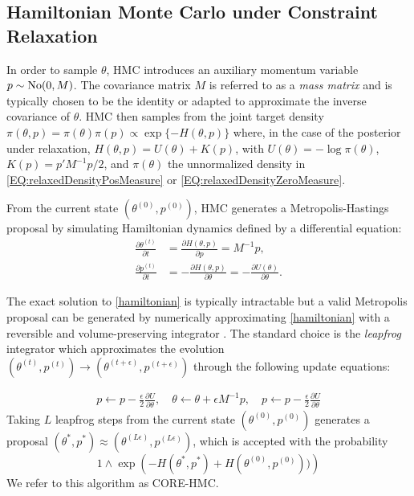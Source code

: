 \documentclass[10pt,fleqn]{article}
\DeclareMathOperator{\1}{\mathbbm{1}} \DeclareMathOperator{\bigO}{\mc O}
\newcommand{\dt}{\epsilon} %
\newcommand{\mass}{M} %
\begin{document}
\subsection{Hamiltonian Monte Carlo under Constraint Relaxation}



In order to sample $\theta$, HMC introduces an auxiliary momentum variable $p
\sim \No(0, \mass)$. The covariance matrix $\mass$ is referred to as a
\textit{mass matrix} and is typically chosen to be the identity or adapted
to approximate the inverse covariance of $\theta$. HMC then samples from the
joint target density $\pi(\theta, p) = \pi(\theta) \pi(p) \propto \exp \{- H(\theta, p)\}$
where, in the case of the posterior under relaxation,
$H(\theta,p) = U(\theta) + K(p)$, with $U(\theta) = -\log\pi(\theta)$, $K(p) = p'\mass^{-1} p/2$, 
and $\pi(\theta)$ the unnormalized density in \eqref{EQ:relaxedDensityPosMeasure} or \eqref{EQ:relaxedDensityZeroMeasure}.

From the current state $(\theta^{(0)},p^{(0)})$, HMC generates a Metropolis-Hastings proposal by simulating Hamiltonian dynamics defined by a differential equation:
\begin{equation} \begin{aligned} \label{hamiltonian} \frac{\partial \theta
^{(t)}}{\partial t} & =\frac{\partial H(\theta, p)}{\partial p} =
\mass^{-1}p,                                                      \\ \frac{\partial p^{(t)}}{\partial t}&
=-\frac{\partial H(\theta, p)}{\partial \theta} = -\frac{\partial
U(\theta)}{\partial \theta}.\end{aligned} \end{equation}

The exact solution to \eqref{hamiltonian} is typically intractable but a
valid Metropolis proposal can be generated by numerically approximating
\eqref{hamiltonian} with a reversible and volume-preserving  integrator
\citep{neal2011mcmc}. The standard choice is the \textit{leapfrog}
integrator which approximates the evolution $(\theta^{(t)},p^{(t)}) \to (\theta^{(t +
\dt)},p^{(t + \dt)})$ through the following update equations:

\begin{equation} \begin{aligned} \label{leap-frog}
p \leftarrow p -
\frac{\dt}{2} \frac{\partial U}{\partial  \theta },\quad \theta \leftarrow  \theta
+ \dt \mass^{-1}p,\quad p \leftarrow p -  \frac{\dt}{2}
\frac{\partial U}{\partial  \theta }\end{aligned} \end{equation} Taking
$L$ leapfrog steps from the current state $(\theta^{(0)},p^{(0)})$
generates a proposal $(\theta^{*},p^{*}) \approx (\theta^{(L \dt)},p^{(L
\dt)})$, which is accepted with the probability $$1\wedge \exp
\left( - H(\theta^{*},p^{*}) + H(\theta^{(0)},p^{(0)}))\right)$$
We refer to this algorithm as CORE-HMC.
\end{document}
